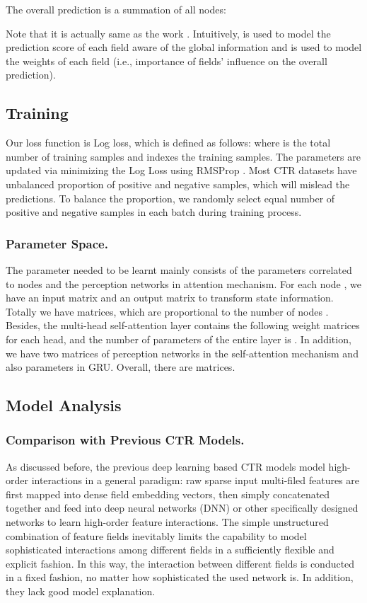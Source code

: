 \documentclass[sigconf]{acmart}
\begin{document}
The overall prediction is a summation of all nodes:

Note that it is actually same as the work \cite{li2015gated}.
Intuitively,  is used to model the prediction score of each field aware of the global information and  is used to model the weights of each field (i.e., importance of fields' influence on the overall prediction).




\subsection{Training}
Our loss function is Log loss, which is defined as follows:
 \label{eqa:logloss}
where  is the total number of training samples and  indexes the training samples.
The parameters are updated via minimizing the Log Loss using RMSProp \cite{tieleman2012lecture}.
Most CTR datasets have unbalanced proportion of positive and negative samples, which will mislead the predictions.
To balance the proportion, we randomly select
 equal number of positive and negative samples in each batch during training process.
 
\subsubsection{\textbf{Parameter Space.}}
The parameter needed to be learnt mainly consists of the parameters correlated to nodes and the perception networks in attention mechanism.
For each node , we have an input matrix  and an output matrix  to transform state information. 
Totally we have  matrices, which are proportional to the number of nodes . 
Besides, the multi-head self-attention layer contains the following weight matrices  for each head, and the number of parameters of the entire layer is .  
In addition, we have two matrices of perception networks in the self-attention mechanism and also parameters in GRU. 
Overall, there are  matrices. 



 
 
\subsection{Model Analysis}
\subsubsection{\textbf{Comparison with Previous CTR Models.}}
As discussed before, the previous deep learning based CTR models model high-order interactions in a general paradigm:
raw sparse input multi-filed features are first mapped into dense field embedding vectors, then simply concatenated together and feed into deep neural networks (DNN) or other specifically designed networks to learn high-order feature interactions. 
The simple unstructured combination of feature fields inevitably limits the capability to model sophisticated interactions among different fields in a sufficiently flexible and explicit fashion.
In this way, the interaction between different fields is conducted in a fixed fashion, no matter how sophisticated the used network is.
In addition, they lack good model explanation.
\end{document}
